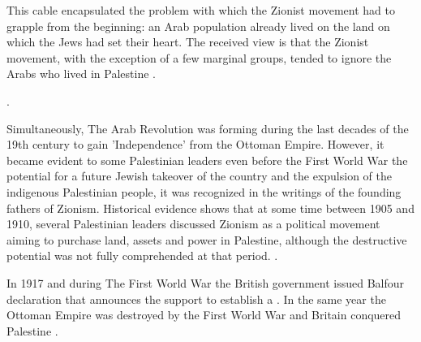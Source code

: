 \centerline{\textit{}}

This cable encapsulated the problem with which the Zionist movement had to grapple from the beginning: an Arab population already lived on the land on which the Jews had set their heart. The received view is that the Zionist movement, with the exception of a few marginal groups, tended to ignore the Arabs who lived in Palestine \citep{Shlaim2014}\citep{Karmi2007}.

 \cite[p.11]{Pappe2006}.


Simultaneously, The Arab Revolution was forming during the last decades of the 19th century to gain 'Independence' from the Ottoman Empire. However, it became evident to some Palestinian leaders even before the First World War the potential for a future Jewish takeover of the country and the expulsion of the indigenous Palestinian people, it was recognized in the writings of the founding fathers of Zionism. Historical evidence shows that at some time between 1905 and 1910, 
several Palestinian leaders discussed Zionism as a political movement 
aiming to purchase land, assets and power in Palestine, although the 
destructive potential was not fully comprehended at that period. \citep{Pappe2006}.



 In 1917 and during The First World War the British government issued Balfour declaration that  announces the support to establish a . In the same year the Ottoman Empire was destroyed by the First World War and Britain conquered Palestine \citep{Morris2004}.  
 
 
 
